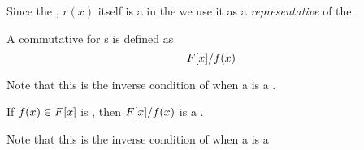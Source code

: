 \begin{definition}[Representative]\label{def:Polynomial_Ring_Properties-Representative}
  Since the , $r(x)$ itself is a  in the  we use it as a \emph{representative} of the .
\end{definition}

\begin{definition}\label{def:Polynomial_Ring_Properties-Commutative_Ring}
  A commutative  for s is defined as
  \begin{equation}\label{eq:Polynomial_Ring_Properties-Commutative_Ring}
    F[x] / f(x)
  \end{equation}
  \begin{remark}
    Note that this is the inverse condition of when a  is a .
  \end{remark}
\end{definition}

\begin{definition}[Field]\label{def:Polynomial_Ring_Properties-Field}
  If $f(x) \in F[x]$ is , then $F[x] / f(x)$ is a .
  \begin{remark}
    Note that this is the inverse condition of when a  is a 
  \end{remark}
\end{definition}

